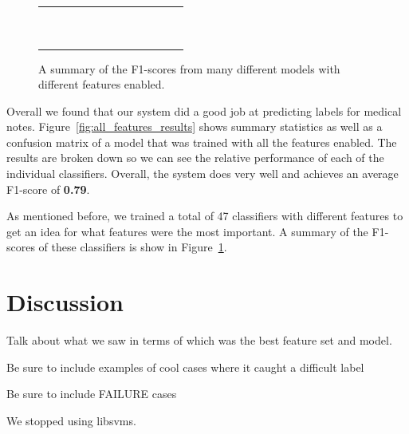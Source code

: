 \documentclass[preprint]{style}
\begin{document}
\begin{figure}
\begin{center}
\begin{tabular}{|l|l|l|l|l|l|l|l|l|l|l||l|l|}
	\checkmark & & & & & & & & & & & &	\\ \hline
	& \checkmark & & & & & & & & & & &	\\ \hline
	& & \checkmark & & & & & & & & & &	\\ \hline
	& & & \checkmark & & & & & & & & &	\\ \hline
	& & & & \checkmark & & & & & & & &	\\ \hline
	& & & & & \checkmark & & & & & & &	\\ \hline
	& & & & & & \checkmark & & & & & &	\\ \hline
	& & & & & & & \checkmark & & & & &	\\ \hline
	& & & & & & & & \checkmark & & & &	\\ \hline
	& & & & & & & & & \checkmark & & &	\\ \hline
	& & & & & & & & & & \checkmark & &	\\ \hline

\end{tabular}
\end{center}
\caption{A summary of the F1-scores from many different models with different features enabled.}
\label{fig:summary_f1_scores}
\end{figure}

Overall we found that our system did a good job at predicting labels for medical notes. Figure~\ref{fig:all_features_results} shows summary statistics as well as a confusion matrix of a model that was trained with all the features enabled. The results are broken down so we can see the relative performance of each of the individual classifiers. Overall, the system does very well and achieves an average F1-score of {\bf 0.79}.

As mentioned before, we trained a total of 47 classifiers with different features to get an idea for what features were the most important. A summary of the F1-scores of these classifiers is show in Figure~\ref{fig:summary_f1_scores}.

\section{Discussion}

Talk about what we saw in terms of which was the best feature set and model. 

Be sure to include examples of cool cases where it caught a difficult label

Be sure to include FAILURE cases


We stopped using libsvms.
\end{document}
